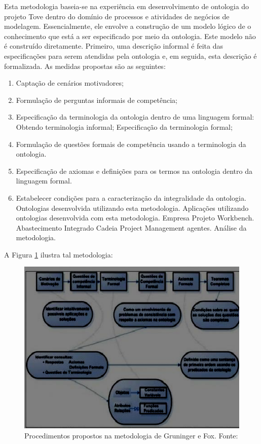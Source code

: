  Esta metodologia baseia-se na experiência em desenvolvimento de ontologia do projeto Tove dentro do domínio de processos e atividades de negócios de
modelagem. Essencialmente, ele envolve a construção de um modelo lógico de o conhecimento que está a ser especificado por meio da ontologia. Este modelo não é construído diretamente. Primeiro, uma descrição informal é feita das especificações para
serem atendidas pela ontologia e, em seguida, esta descrição é formalizada. As medidas propostas são as seguintes:

\begin{enumerate}
 \item Captação de cenários motivadores;
 \item Formulação de perguntas informais de competência;
 \item Especificação da terminologia da ontologia dentro de uma linguagem formal:
  \subitem Obtendo terminologia informal;
  \subitem Especificação da terminologia formal;
 \item Formulação de questões formais de competência usando a terminologia da ontologia.
 \item Especificação de axiomas e definições para os termos na ontologia dentro da linguagem formal.
 \item Estabelecer condições para a caracterização da integralidade da ontologia.
  \subitem Ontologias desenvolvida utilizando esta metodologia.
  \subitem Aplicações utilizando ontologias desenvolvida com esta metodologia.
  \subitem Empresa Projeto Workbench.
  \subitem Abastecimento Integrado Cadeia Project Management agentes.
  \subitem Análise da metodologia.\cite{VariosAutores2009}
\end{enumerate}

\pagebreak

A Figura \ref{fig:procedimentos_gruninger} ilustra tal metodologia:

\begin{figure}[h] 
\centering
\includegraphics[scale=0.65]{Figuras/3.png}
\caption[Procedimentos propostos na metodologia de Gruninger e Fox]
{Procedimentos propostos na metodologia de Gruninger e Fox. Fonte: \cite{DanielaLucas2008}}
\label{fig:procedimentos_gruninger}
\end{figure}

